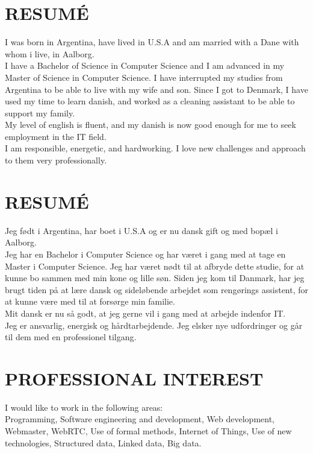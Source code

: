 \documentclass[11pt,a4paper,sans]{moderncv}        %
\begin{document}
\makecvtitle

\ifenglish
\section{RESUMÉ}
I was born in Argentina, have lived in U.S.A and am married with a Dane with whom i live, in Aalborg.\\
I have a Bachelor of Science in Computer Science and I am advanced in my Master of Science in Computer Science. I have interrupted my studies from Argentina to be able to live with my wife and son. Since I got to Denmark, I have used my time to learn danish, and worked as a cleaning assistant to be able to support my family.\\
My level of english is fluent, and my danish is now good enough for me to seek employment in the IT field.\\
I am responsible, energetic, and hardworking. I love new challenges and approach to them very professionally.
\else
\section{RESUMÉ}
Jeg født i Argentina, har boet i U.S.A og er nu dansk gift og med bopæl i Aalborg.\\
Jeg har en Bachelor i Computer Science og har været i gang med at tage en Master i Computer Science. Jeg har været nødt til at afbryde dette studie, for at kunne bo sammen med min kone og lille søn. Siden jeg kom til Danmark, har jeg brugt tiden på at lære dansk og sideløbende arbejdet som rengørings assistent, for at kunne være med til at forsørge min familie.\\
Mit dansk er nu så godt, at jeg gerne vil i gang med at arbejde indenfor IT.\\
Jeg er ansvarlig, energisk og hårdtarbejdende. Jeg elsker nye udfordringer og går til dem med en professionel tilgang.
\fi

\ifenglish
\section{PROFESSIONAL INTEREST}
I would like to work in the following areas:\\
Programming, Software engineering and development, Web development, Webmaster, WebRTC, Use of formal methods, Internet of Things, Use of new technologies, Structured data, Linked data, Big data.
\else
\end{document}
